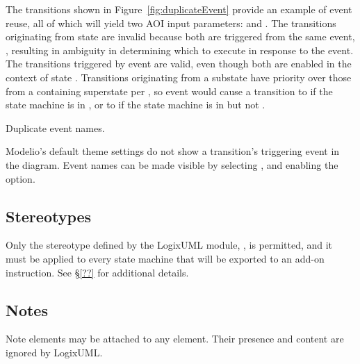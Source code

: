 The transitions shown in Figure~\ref{fig:duplicateEvent} provide an example
of event reuse, all of which will yield two AOI input parameters:
 and .
The transitions originating from state  are invalid because
both are triggered from the same event, ,
resulting in ambiguity in determining which to execute in response to the event.
The transitions triggered by event  are valid, even though both
are enabled in the context of state .
Transitions originating from a substate have priority over those
from a containing superstate per \textcite[\S14.2.3.9.4]{OMGUML}, so
event  would cause a transition to  if the
state machine is in , or to  if the state
machine is in  but not .

               {Duplicate event names.}

Modelio's default theme settings do not show a transition's triggering
event in the diagram. Event names can be made visible by selecting
, and enabling the
 option.


\subsection{Stereotypes}

Only the stereotype defined by the LogixUML module,
\identifier{\stereotypeName}, is permitted, and it must be applied to
every state machine that will be exported to an add-on instruction.
See \S\ref{??} for additional details.


\subsection{Notes}

Note elements may be attached to any element. Their presence and content
are ignored by LogixUML.
